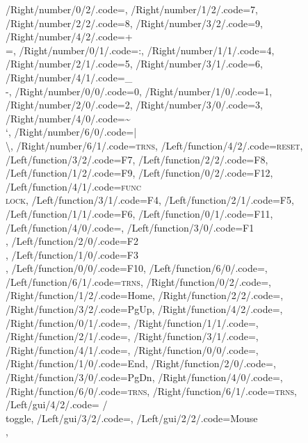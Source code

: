 \documentclass[]{article}
\begin{document}
{%
    /Right/number/0/2/.code=,
        /Right/number/1/2/.code=7,
        /Right/number/2/2/.code=8,
        /Right/number/3/2/.code=9,
        /Right/number/4/2/.code=+\\{=},
    /Right/number/0/1/.code=:,
        /Right/number/1/1/.code=4,
        /Right/number/2/1/.code=5,
        /Right/number/3/1/.code=6,
        /Right/number/4/1/.code=\_\\-,
    /Right/number/0/0/.code=0,
        /Right/number/1/0/.code=1,
        /Right/number/2/0/.code=2,
        /Right/number/3/0/.code=3,
        /Right/number/4/0/.code=\textasciitilde\\`,
    /Right/number/6/0/.code=|\\\textbackslash,
        /Right/number/6/1/.code=\textsc{trns},
%
%
    /Left/function/4/2/.code=\textsc{reset},
        /Left/function/3/2/.code=F7,
        /Left/function/2/2/.code=F8,
        /Left/function/1/2/.code=F9,
        /Left/function/0/2/.code=F12,
    /Left/function/4/1/.code=\textsc{func}\\\textsc{lock},
        /Left/function/3/1/.code=F4,
        /Left/function/2/1/.code=F5,
        /Left/function/1/1/.code=F6,
        /Left/function/0/1/.code=F11,
    /Left/function/4/0/.code=\shift,
        /Left/function/3/0/.code=F1\\\ctrl,
        /Left/function/2/0/.code=F2\\\Alt,
        /Left/function/1/0/.code=F3\\\cmd,
        /Left/function/0/0/.code=F10,
    /Left/function/6/0/.code=,
        /Left/function/6/1/.code=\textsc{trns},
%
    /Right/function/0/2/.code=\faVolumeUp,
        /Right/function/1/2/.code=Home,
        /Right/function/2/2/.code=\arrowkeyup,
        /Right/function/3/2/.code=PgUp,
        /Right/function/4/2/.code=\faSunO,
    /Right/function/0/1/.code=\faVolumeDown,
        /Right/function/1/1/.code=\arrowkeyleft,
        /Right/function/2/1/.code=\arrowkeydown,
        /Right/function/3/1/.code=\arrowkeyright,
        /Right/function/4/1/.code=\faCircleThin,
    /Right/function/0/0/.code=\faVolumeOff,
        /Right/function/1/0/.code=End,
        /Right/function/2/0/.code=,
        /Right/function/3/0/.code=PgDn,
        /Right/function/4/0/.code=\capslock,
    /Right/function/6/0/.code=\textsc{trns},
        /Right/function/6/1/.code=\textsc{trns},
%
%
    /Left/gui/4/2/.code=\faBluetoothB{} / \faUsb\\toggle,
        /Left/gui/3/2/.code=,
        /Left/gui/2/2/.code=Mouse\\\arrowkeyup,
}
\end{document}
